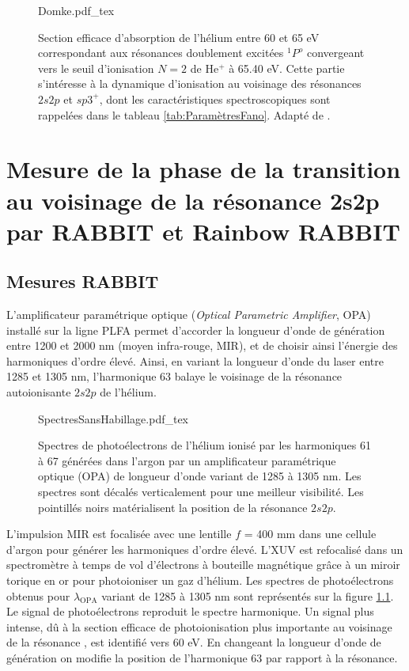 \begin{figure}[h]
\centering
\def\svgwidth{0.5\textwidth}
{Domke.pdf_tex}
\caption{Section efficace d'absorption de l'hélium entre 60 et 65 eV correspondant aux résonances doublement excitées $^1P^o$ convergeant vers le seuil d'ionisation $N=2$ de He$^+$ à 65.40 eV. Cette partie s'intéresse à la dynamique d'ionisation au voisinage des résonances $2s2p$ et $sp3^+$, dont les caractéristiques spectroscopiques sont rappelées dans le tableau \ref{tab:ParamètresFano}. Adapté de .}
\label{fig:Domke}
\end{figure}


\chapter[Mesure de la phase de la transition au voisinage de la résonance 2s2p par RABBIT et Rainbow RABBIT]{Mesure de la phase de la transition au voisinage de la résonance \MakeLowercase{2s2p} par RABBIT et Rainbow RABBIT}
\section{Mesures RABBIT}
L'amplificateur paramétrique optique (\textit{Optical Parametric Amplifier}, OPA) installé sur la ligne PLFA  permet d'accorder la longueur d'onde de génération entre 1200 et 2000 nm (moyen infra-rouge, MIR), et de choisir ainsi l'énergie des harmoniques d'ordre élevé. Ainsi, en variant la longueur d'onde du laser entre 1285 et 1305 nm, l'harmonique 63 balaye le voisinage de la résonance autoionisante $2s2p$ de l'hélium. 

\begin{figure} [h]
\centering
\def\svgwidth{\textwidth}
{SpectresSansHabillage.pdf_tex}
\caption{Spectres de photoélectrons de l'hélium ionisé par les harmoniques 61 à 67 générées dans l'argon par un amplificateur paramétrique optique (OPA) de longueur d'onde variant de 1285 à 1305 nm. Les spectres sont décalés verticalement pour une meilleur visibilité. Les pointillés noirs matérialisent la position de la résonance $2s2p$.}
\label{fig:SpectresSansHabillageHe}
\end{figure}

L'impulsion MIR est focalisée avec une lentille $f$ = 400 mm dans une cellule d'argon pour générer les harmoniques d'ordre élevé. L'XUV est refocalisé dans un spectromètre à temps de vol d'électrons à bouteille magnétique grâce à un miroir torique en or pour photoioniser un gaz d'hélium. Les spectres de photoélectrons obtenus pour $\lambda_{\text{OPA}}$ variant de 1285 à 1305 nm sont représentés sur la figure \ref{fig:SpectresSansHabillageHe}. Le signal de photoélectrons reproduit le spectre harmonique. Un signal plus intense, dû à la section efficace de photoionisation plus importante au voisinage de la résonance , est identifié vers 60 eV. En changeant la longueur d'onde de génération on modifie la position de l'harmonique 63 par rapport à la résonance. 

